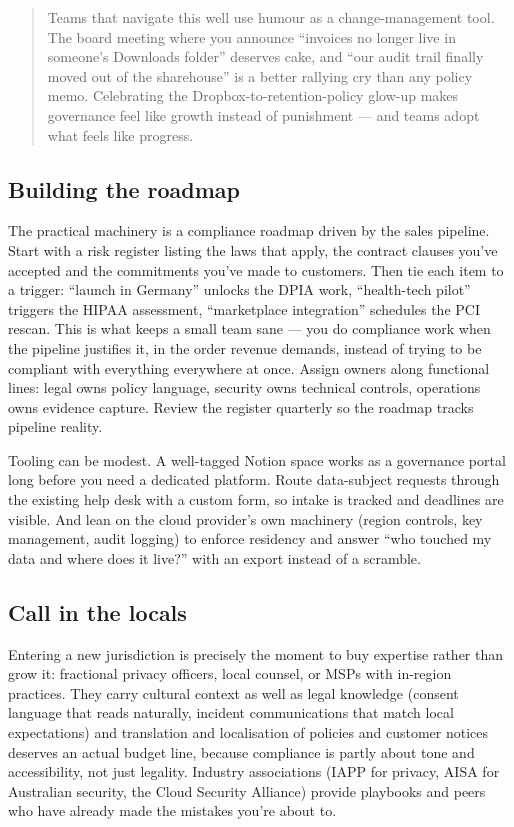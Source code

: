 \begin{quote}\small
Teams that navigate this well use humour as a change-management tool. The board meeting where you announce ``invoices no longer live in someone's Downloads folder'' deserves cake, and ``our audit trail finally moved out of the sharehouse'' is a better rallying cry than any policy memo. Celebrating the Dropbox-to-retention-policy glow-up makes governance feel like growth instead of punishment — and teams adopt what feels like progress.
\end{quote}



\subsection{Building the roadmap}


The practical machinery is a compliance roadmap driven by the sales pipeline. Start with a risk register listing the laws that apply, the contract clauses you've accepted and the commitments you've made to customers. Then tie each item to a trigger: ``launch in Germany'' unlocks the DPIA work, ``health-tech pilot'' triggers the HIPAA assessment, ``marketplace integration'' schedules the PCI rescan. This is what keeps a small team sane — you do compliance work when the pipeline justifies it, in the order revenue demands, instead of trying to be compliant with everything everywhere at once. Assign owners along functional lines: legal owns policy language, security owns technical controls, operations owns evidence capture. Review the register quarterly so the roadmap tracks pipeline reality.


Tooling can be modest. A well-tagged Notion space works as a governance portal long before you need a dedicated platform. Route data-subject requests through the existing help desk with a custom form, so intake is tracked and deadlines are visible. And lean on the cloud provider's own machinery (region controls, key management, audit logging) to enforce residency and answer ``who touched my data and where does it live?'' with an export instead of a scramble.



\subsection{Call in the locals}


Entering a new jurisdiction is precisely the moment to buy expertise rather than grow it: fractional privacy officers, local counsel, or MSPs with in-region practices. They carry cultural context as well as legal knowledge (consent language that reads naturally, incident communications that match local expectations) and translation and localisation of policies and customer notices deserves an actual budget line, because compliance is partly about tone and accessibility, not just legality. Industry associations (IAPP for privacy, AISA for Australian security, the Cloud Security Alliance) provide playbooks and peers who have already made the mistakes you're about to.


